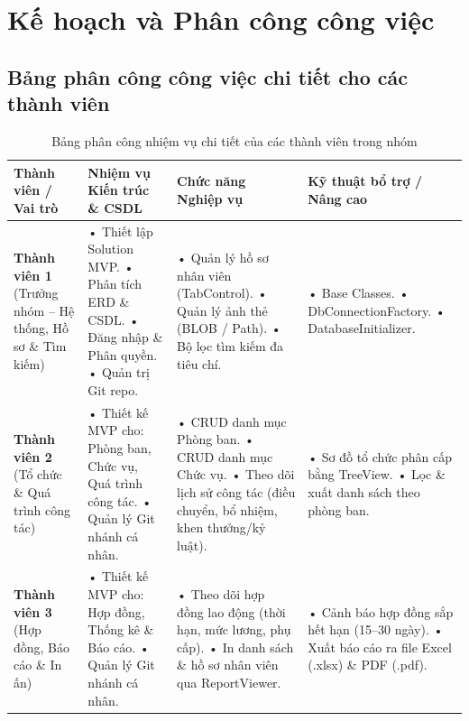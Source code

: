 \documentclass[12pt,a4paper]{report}
\begin{document}
\section{Kế hoạch và Phân công công việc}

\subsection{Bảng phân công công việc chi tiết cho các thành viên}

\begin{table}[htbp]
\centering
\small
\begin{tabularx}{\textwidth}{|p{3cm}|p{3.5cm}|p{4.2cm}|p{3.8cm}|}
\hline
\textbf{Thành viên / Vai trò} & \textbf{Nhiệm vụ Kiến trúc \& CSDL} & \textbf{Chức năng Nghiệp vụ} & \textbf{Kỹ thuật bổ trợ / Nâng cao} \\ \hline
\textbf{Thành viên 1} \newline (Trưởng nhóm -- Hệ thống, Hồ sơ \& Tìm kiếm) & • Thiết lập Solution MVP. \newline • Phân tích ERD \& CSDL. \newline • Đăng nhập \& Phân quyền. \newline • Quản trị Git repo. & • Quản lý hồ sơ nhân viên (TabControl). \newline • Quản lý ảnh thẻ (BLOB / Path). \newline • Bộ lọc tìm kiếm đa tiêu chí. & • Base Classes. \newline • DbConnectionFactory. \newline • DatabaseInitializer. \\ \hline
\textbf{Thành viên 2} \newline (Tổ chức \& Quá trình công tác) & • Thiết kế MVP cho: Phòng ban, Chức vụ, Quá trình công tác. \newline • Quản lý Git nhánh cá nhân. & • CRUD danh mục Phòng ban. \newline • CRUD danh mục Chức vụ. \newline • Theo dõi lịch sử công tác (điều chuyển, bổ nhiệm, khen thưởng/kỷ luật). & • Sơ đồ tổ chức phân cấp bằng TreeView. \newline • Lọc \& xuất danh sách theo phòng ban. \\ \hline
\textbf{Thành viên 3} \newline (Hợp đồng, Báo cáo \& In ấn) & • Thiết kế MVP cho: Hợp đồng, Thống kê \& Báo cáo. \newline • Quản lý Git nhánh cá nhân. & • Theo dõi hợp đồng lao động (thời hạn, mức lương, phụ cấp). \newline • In danh sách \& hồ sơ nhân viên qua ReportViewer. & • Cảnh báo hợp đồng sắp hết hạn (15--30 ngày). \newline • Xuất báo cáo ra file Excel (.xlsx) \& PDF (.pdf). \\ \hline
\end{tabularx}
\caption{Bảng phân công nhiệm vụ chi tiết của các thành viên trong nhóm}
\end{table}
\end{document}
